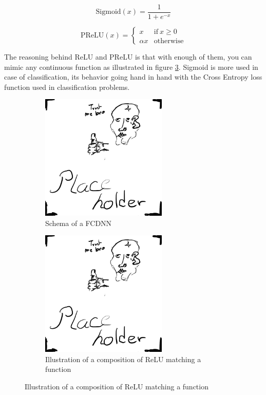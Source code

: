 \begin{minipage}{0.5\linewidth}
  \begin{equation}
    \label{sec:ml:sigmoid}
    \mathrm{Sigmoid}(x) = \frac{1}{1+ e^{-x}}
  \end{equation}
\end{minipage}
\begin{minipage}{0.5\linewidth}
  \begin{equation}
    \label{sec:ml:prelu}
    \mathrm{PReLU}(x) = \begin{cases}
      x & \mathrm{if} ~ x \geq 0 \\
      \alpha x & \mathrm{otherwise}
    \end{cases}
  \end{equation}
\end{minipage}


The reasoning behind ReLU and PReLU is that with enough of them, you can mimic any continuous function as illustrated in figure \ref{fig:ml:relu-mimic}. Sigmoid is more used in case of classification, its behavior going hand in hand with the Cross Entropy loss function used in classification problems.

\begin{figure}[ht]
  \begin{subfigure}[b]{0.48\textwidth}
    \centering
    \includegraphics[height=6cm]{images/placeholder.jpg}
    \caption{Schema of a FCDNN}
    \label{fig:ml:fcdnn}
  \end{subfigure}
  \hfill
  \begin{subfigure}[b]{0.48\textwidth}
    \centering
    \includegraphics[height=6cm]{images/placeholder.jpg}
    \caption{Illustration of a composition of ReLU matching a function}
    \label{fig:ml:relu-mimic}
  \end{subfigure}
\end{figure}

